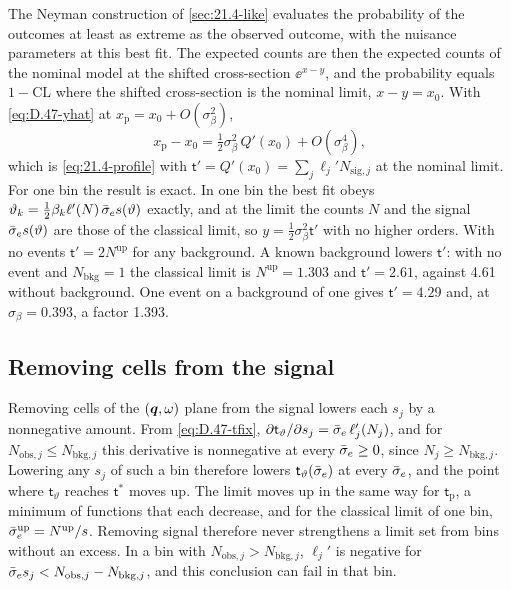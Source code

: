 The Neyman construction of \cref{sec:21.4-like} evaluates the probability of the outcomes at least as extreme as the observed outcome, with the nuisance parameters at this best fit. The expected counts are then the expected counts of the nominal model at the shifted cross-section $\ee^{x - y}$, and the probability equals $1 - \mathrm{CL}$ where the shifted cross-section is the nominal limit, $x - y = x_0$. With \cref{eq:D.47-yhat} at $x_{\mathrm{p}} = x_0 + O(\sigma_\beta^2)$,
\begin{equation*}
  x_{\mathrm{p}} - x_0 = \tfrac12\sigma_\beta^2\,Q'(x_0) + O(\sigma_\beta^4) ,
\end{equation*}
which is \cref{eq:21.4-profile} with $\mathsf{t}' = Q'(x_0) = \sum_j\ell_j'N_{\mathrm{sig},j}$ at the nominal limit. For one bin the result is exact. In one bin the best fit obeys $\vartheta_k = \tfrac12\beta_k\ell'(N)\,\bar{\sigma}_{e} s(\vartheta)$ exactly, and at the limit the counts $N$ and the signal $\bar{\sigma}_{e} s(\vartheta)$ are those of the classical limit, so $y = \tfrac12\sigma_\beta^2\mathsf{t}'$ with no higher orders. With no events $\mathsf{t}' = 2N^{\mathrm{up}}$ for any background. A known background lowers $\mathsf{t}'$: with no event and $N_{\mathrm{bkg}} = 1$ the classical limit is $N^{\mathrm{up}} = 1.303$ and $\mathsf{t}' = 2.61$, against 4.61 without background. One event on a background of one gives $\mathsf{t}' = 4.29$ and, at $\sigma_\beta = 0.393$, a factor 1.393.

\subsection{Removing cells from the signal}

Removing cells of the $(\bm{q},\omega)$ plane from the signal lowers each $s_j$ by a nonnegative amount. From \cref{eq:D.47-tfix}, $\partial\mathsf{t}_\vartheta/\partial s_j = \bar{\sigma}_{e}\,\ell_j'(N_j)$, and for $N_{\mathrm{obs},j} \le N_{\mathrm{bkg},j}$ this derivative is nonnegative at every $\bar{\sigma}_{e} \ge 0$, since $N_j \ge N_{\mathrm{bkg},j}$. Lowering any $s_j$ of such a bin therefore lowers $\mathsf{t}_\vartheta(\bar{\sigma}_{e})$ at every $\bar{\sigma}_{e}$, and the point where $\mathsf{t}_\vartheta$ reaches $\mathsf{t}^*$ moves up. The limit moves up in the same way for $\mathsf{t}_{\mathrm{p}}$, a minimum of functions that each decrease, and for the classical limit of one bin, $\bar{\sigma}_{e}^{\mathrm{up}} = N^{\mathrm{up}}/s$. Removing signal therefore never strengthens a limit set from bins without an excess. In a bin with $N_{\mathrm{obs},j} > N_{\mathrm{bkg},j}$, $\ell_j'$ is negative for $\bar{\sigma}_{e} s_j < N_{\mathrm{obs},j} - N_{\mathrm{bkg},j}$, and this conclusion can fail in that bin.
